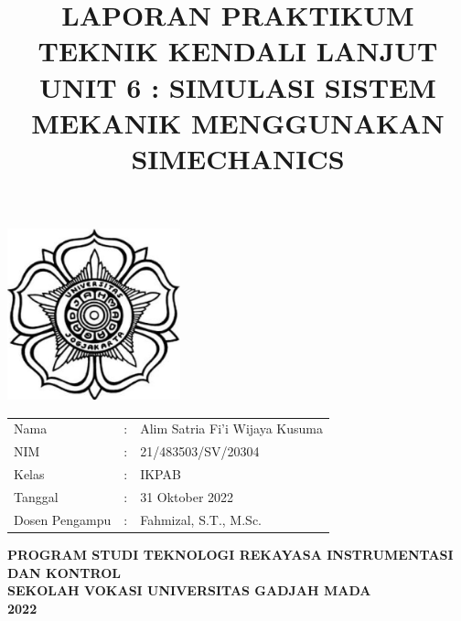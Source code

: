 \documentclass[12 pt]{article}
\title{\large \textbf{LAPORAN PRAKTIKUM TEKNIK KENDALI LANJUT} \\ \textbf{UNIT 6 : SIMULASI SISTEM MEKANIK MENGGUNAKAN SIMECHANICS}\linebreak}
\author{}
\date{}
\begin{document}
\clearpage
\maketitle
\thispagestyle{empty} %

\begin{center}
\includegraphics[width=5cm,height=5cm]{cover_laporan/logo_ugm.png}
\end{center}

\vspace{1 cm}

\begin{center}
\begin{tabular}{lcl}
Nama & : & Alim Satria Fi'i Wijaya Kusuma \\
NIM & : & 21/483503/SV/20304\\
Kelas & : & IKPAB\\
Tanggal & : & 31 Oktober 2022 \\
Dosen Pengampu & : & Fahmizal, S.T., M.Sc.
\end{tabular}
\newline
\newline
\newline
\newline
\large{\textbf{PROGRAM STUDI TEKNOLOGI REKAYASA INSTRUMENTASI DAN KONTROL}} \\
\textbf{SEKOLAH VOKASI UNIVERSITAS GADJAH MADA} \\
\textbf{2022}
\end{center}

\pagebreak
\tableofcontents
\pagebreak
\listoffigures
\pagebreak
\listoftables
\pagebreak


\end{document}
